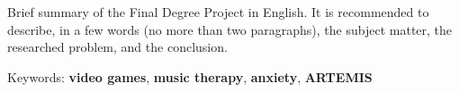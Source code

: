 
Brief summary of the Final Degree Project in English. It is recommended to describe, in a few words (no more than two paragraphs), the subject matter, the researched problem, and the conclusion.

\noindent Keywords: \textbf{video games}, \textbf{music therapy}, \textbf{anxiety}, \textbf{ARTEMIS}
